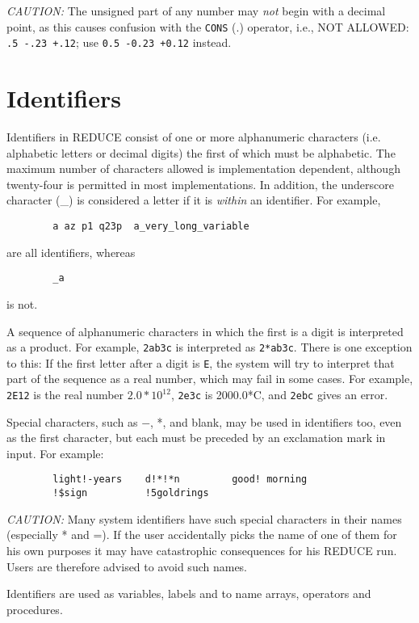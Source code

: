 \documentclass[11pt,letterpaper]{book}
\newcommand{\REDUCE}{REDUCE}
\begin{document}
{\it CAUTION:}  The unsigned part of any number may {\em not\/}
begin with a decimal point, as this causes confusion with the {\tt CONS} (.)
operator, i.e., NOT ALLOWED: {\tt .5  -.23  +.12};
use {\tt 0.5 -0.23 +0.12} instead.

\section{Identifiers}

Identifiers in {\REDUCE} consist of one or more
alphanumeric characters (i.e. alphabetic letters or decimal
digits) the first of which must be alphabetic.  The maximum number of
characters allowed is implementation dependent, although twenty-four is
permitted in most implementations.  In addition, the underscore character
(\_) is considered a letter if it is {\it within} an identifier.  For example,
{\small\begin{verbatim}
        a az p1 q23p  a_very_long_variable
\end{verbatim}}
are all identifiers, whereas
{\small\begin{verbatim}
        _a
\end{verbatim}}
is not.

A sequence of alphanumeric characters in which the first is a digit is
interpreted as a product.  For example, {\tt 2ab3c} is interpreted as
{\tt 2*ab3c}.  There is one exception to this:  If the first letter after a
digit is {\tt E}, the system will try to interpret that part of the
sequence as a real number, which may fail in some cases.  For
example, {\tt 2E12} is the real number $2.0*10^{12}$, {\tt 2e3c} is
2000.0*C, and {\tt 2ebc} gives an error.

Special characters, such as $-$, *, and blank, may be used in identifiers
too, even as the first character, but each must be preceded by an
exclamation mark in input.  For example:
{\small\begin{verbatim}
        light!-years    d!*!*n         good! morning
        !$sign          !5goldrings
\end{verbatim}}
{\it CAUTION:} Many system identifiers have such special characters in their
names (especially * and =). If the user accidentally picks the name of one
of them for his own purposes it may have catastrophic consequences for his
{\REDUCE} run.  Users are therefore advised to avoid such names.

Identifiers are used as variables, labels and to name arrays, operators
and procedures.
\end{document}
